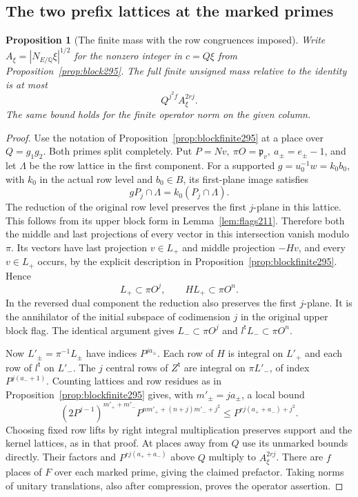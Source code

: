 \documentclass[a4paper,11pt]{article}
\newtheorem{proposition}{Proposition}[section]
\theoremstyle{definition}
\theoremstyle{remark}
\numberwithin{equation}{section}
\begin{document}
\subsection{The two prefix lattices at the marked primes}\label{nav:II-67}
\begin{proposition}[The finite mass with the row congruences imposed]\leavevmode
\label{prop:blockmarks296}
Write \(A_\xi=|N_{E/\mathbb Q}\xi|^{1/2}\) for the nonzero
integer in \(c=Q\xi\) from Proposition~\ref{prop:block295}.
The full finite unsigned mass relative to the identity is at most
\[
                    Q^{j^2 f}A_\xi^{2rj}.
\]
The same bound holds for the finite operator norm on the given
column.
\end{proposition}
\begin{proof}
Use the notation of Proposition~\ref{prop:blockfinite295} at
a place over \(Q=g_1g_2\). Both primes split completely. Put
\(P=Nv,\ \pi O=\mathfrak p_v,\ a_\pm=e_\pm-1\), and let
\(\Lambda\) be the row lattice in the first component.
For a supported \(g=u_0^{-1}w=k_0b_0\), with \(k_0\) in the
actual row level and \(b_0\in B\), its first-plane image
satisfies
\[
     gP_j\cap\Lambda=k_0(P_j\cap\Lambda).
\]
The reduction of the original row level preserves the first
\(j\)-plane in this lattice. This follows from its upper block
form in Lemma~\ref{lem:flags211}. Therefore both the middle
and last projections of every vector in this intersection
vanish modulo \(\pi\). Its vectors have last projection
\(v\in L_+\) and middle projection \(-Hv\), and every
\(v\in L_+\) occurs, by the explicit description in
Proposition~\ref{prop:blockfinite295}. Hence
\[
           L_+\subset\pi O^j,\qquad H L_+\subset\pi O^n.
\]
In the reversed dual component the reduction also preserves the
first \(j\)-plane. It is the annihilator of the initial
subspace of codimension \(j\) in the original upper block
flag. The identical argument
gives \(L_-\subset\pi O^j\) and \(l^{\mathsf t} L_-\subset
\pi O^n\).

Now \(L'_\pm=\pi^{-1}L_\pm\) have indices \(P^{ja_\pm}\).
Each row of \(H\) is integral on \(L'_+\) and each row of
\(l^{\mathsf t}\) on \(L'_-\). The \(j\) central rows of
\(Z^{\mathsf t}\) are integral on \(\pi L'_-\), of index
\(P^{j(a_-+1)}\). Counting lattices and row residues as in
Proposition~\ref{prop:blockfinite295} gives, with
\(m'_\pm=ja_\pm\), a local bound
\[
 (2P^{j-1})^{m'_++m'_-}
 P^{n m'_+ +(n+j)m'_-+j^2}
                 \le P^{rj(a_++a_-)+j^2}.
\]
Choosing fixed row lifts by right integral multiplication
preserves support and the kernel lattices, as in that proof.
At places away from \(Q\) use its unmarked bounds directly.
Their factors and \(P^{rj(a_++a_-)}\) above \(Q\) multiply to
\(A_\xi^{2rj}\). There are \(f\) places of \(F\) over each
marked prime, giving the claimed prefactor. Taking norms of
unitary translations, also after compression, proves the
operator assertion.
\end{proof}
\end{document}
